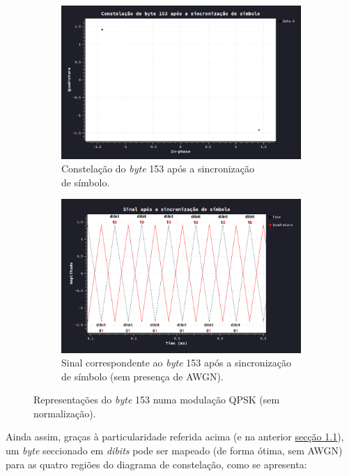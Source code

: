 \begin{figure}[H]
    \begin{subfigure}[b]{0.45\linewidth}
        \centering
        \includegraphics[width = 0.8\linewidth]{img/intro/const-byte153-qpsk.png}
        \caption{Constelação do \textit{byte} 153 após a sincronização\\ de símbolo.}
        \label{fig:const-byte153-qpsk}
        \vspace{1ex}
    \end{subfigure}
    \begin{subfigure}[b]{0.45\linewidth}
        \centering
        \includegraphics[width = 0.8\linewidth]{img/intro/detected-byte153-qpsk.png}
        \caption{Sinal correspondente ao \textit{byte} 153 após a sincronização de símbolo (sem presença de AWGN).}
        \label{fig:detected-byte153-qpsk}
        \vspace{1ex}
    \end{subfigure}
    \caption{Representações do \textit{byte} 153 numa modulação QPSK (sem normalização).}
\end{figure}
Ainda assim, graças à particularidade referida acima (e na anterior \hyperref[subsubsec:const-mod]{secção 1.1}), um \textit{byte} seccionado em \textit{dibits} pode ser mapeado (de forma ótima, sem AWGN) para as quatro regiões do diagrama de constelação, como se apresenta:

